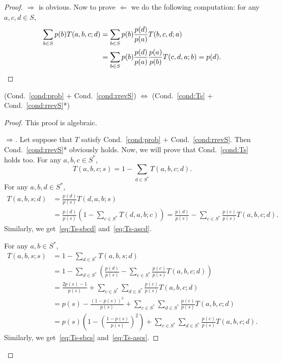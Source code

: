 \documentclass[AHL,Unicode,longabstracts]{cedram}
\newcounter{a}
\newcommand{\Cond}{Cond.}
\begin{document}
\begin{proof}
$\Rightarrow$ is obvious. Now to prove $\Leftarrow$ we do the following computation: for any $a,c,d\in S$,
\begin{align*}
\sum_{b\in S} p(b) T(a,b,c;d) & = \sum_{b\in S} p(b) \frac{p(d)}{p(a)} T(b,c,d;a) \\
& = \sum_{b\in S} p(b) \frac{p(d)}{p(a)} \frac{p(a)}{p(b)} T(c,d,a;b) = p(d).\qedhere
\end{align*}
\end{proof}

\begin{lemm}\label{lem:equiv-5}
(\Cond~\ref{cond:prob} + \Cond~\ref{cond:rrevS}) $\Leftrightarrow$ (\Cond~\ref{cond:Ts} + \Cond~\ref{cond:rrevS}*)
\end{lemm}

\begin{proof}
This proof is algebraic.

\begin{proof}[$\Rightarrow$]
Let suppose that $T$ satisfy \Cond~\ref{cond:prob} + \Cond~\ref{cond:rrevS}. Then \Cond~\ref{cond:rrevS}* obviously holds. Now, we will prove that \Cond~\ref{cond:Ts} holds too.
For any $a,b,c \in S^*$,
\[
T(a,b,c;s) = 1 - \sum_{d \in S^*} T(a,b,c;d).
\]
For any $a,b,d \in S^*$,
\begin{align*}
T(a,b,s;d) &= \frac{p(d)}{p(s)} T(d,a,b;s) \\
&= \frac{p(d)}{p(s)} \left(1 - \sum_{c \in S^*} T(d,a,b;c)\right) = \frac{p(d)}{p(s)} - \sum_{c \in S^*} \frac{p(c)}{p(s)} T(a,b,c;d).
\end{align*}
Similarly, we get~\eqref{eq:Ts-sbcd} and~\eqref{eq:Ts-ascd}.

For any $a,b \in S^*$,
\begin{align*}
T(a,b,s;s) & = 1 - \sum_{d \in S^*} T(a,b,s;d) \\
& = 1 - \sum_{d \in S^*} \left(\frac{p(d)}{p(s)} - \sum_{c \in S^*} \frac{p(c)}{p(s)}T(a,b,c;d) \right)\\
& = \frac{2p(s)-1}{p(s)} + \sum_{c \in S^*} \sum_{d \in S^*} \frac{p(c)}{p(s)}T(a,b,c;d)\\
& = p(s) - \frac{(1-p(s))^2}{p(s)} + \sum_{c \in S^*} \sum_{d \in S^*} \frac{p(c)}{p(s)}T(a,b,c;d)\\
& = p(s) \left(1 - \left(\frac{1-p(s)}{p(s)}\right)^2 \right) + \sum_{c \in S^*} \sum_{d \in S^*} \frac{p(c)}{p(s)}T(a,b,c;d).
\end{align*}
Similarly, we get~\eqref{eq:Ts-sbcs} and~\eqref{eq:Ts-ascs}.


\end{proof}
\end{proof}
\end{document}
